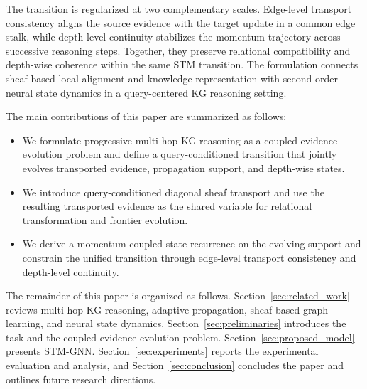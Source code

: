 \documentclass[a4paper,fleqn]{cas-sc}
\begin{document}
The transition is regularized at two complementary scales. Edge-level transport
consistency aligns the source evidence with the target update in a common edge
stalk, while depth-level continuity stabilizes the momentum trajectory across
successive reasoning steps. Together, they preserve relational compatibility
and depth-wise coherence within the same STM transition. The formulation
connects sheaf-based local alignment and knowledge representation
\citep{bodnar2022neural,barbero2022sheaf,gebhart2023knowledge} with second-order
neural state dynamics \citep{sander2021momentum,rusch2022graphcon} in a
query-centered KG reasoning setting.


The main contributions of this paper are summarized as follows:
\begin{itemize}
\item We formulate progressive multi-hop KG reasoning as a coupled evidence
evolution problem and define a query-conditioned transition that jointly evolves
transported evidence, propagation support, and depth-wise states.
\item We introduce query-conditioned diagonal sheaf transport and use the
resulting transported evidence as the shared variable for relational
transformation and frontier evolution.
\item We derive a momentum-coupled state recurrence on the evolving support and
constrain the unified transition through edge-level transport consistency and
depth-level continuity.
\end{itemize}

The remainder of this paper is organized as follows. Section~\ref{sec:related_work}
reviews multi-hop KG reasoning, adaptive propagation, sheaf-based graph learning,
and neural state dynamics. Section~\ref{sec:preliminaries} introduces the task and
the coupled evidence evolution problem. Section~\ref{sec:proposed_model} presents
STM-GNN. Section~\ref{sec:experiments} reports the experimental evaluation and
analysis, and Section~\ref{sec:conclusion} concludes the paper and outlines
future research directions.

\end{document}
